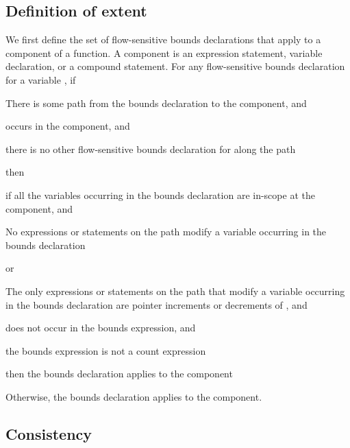 \subsection{Definition of extent}
\label{section:extent-definition}

We first define the set of flow-sensitive bounds declarations that apply to a 
component of a function.  A component is an expression statement,
variable declaration, or a compound statement. For any flow-sensitive bounds
declaration for a variable , if

\begin{compactenum}
\item
  There is some path from the bounds declaration to the 
  component, and
\item
   occurs in the component, and
\item
  there is no other flow-sensitive bounds declaration for 
   along the path
\end{compactenum}

then

\begin{compactenum}
\item
  if all the variables occurring in the bounds declaration are 
  in-scope at the component, and
  \begin{compactenum} 
  \item No expressions or statements on the path modify a variable
  occurring in the bounds declaration
  \item or
  \begin{compactenum}
  \item The only expressions or statements on the path that
   modify a variable occurring in the bounds declaration 
   are pointer increments or decrements of , and
   \item {} does not occur in the bounds expression, and
   \item the bounds expression is not a count expression
   \end{compactenum}
   \end{compactenum}
   then the bounds declaration applies to the component   
\item 
   Otherwise, the bounds declaration 
   applies to the component.
\end{compactenum}
  
 \subsection{Consistency}

